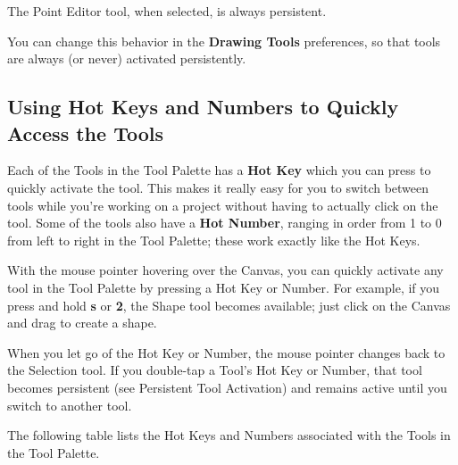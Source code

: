 \documentclass[../main.tex]{subfiles}
\begin{document}

\begin{ognote}
  The Point Editor tool, when selected, is always persistent.
\end{ognote}

You can change this behavior in the \textbf{Drawing Tools} preferences, so that tools are always
(or never) activated persistently.

\subsection{Using Hot Keys and Numbers to Quickly Access the Tools}

Each of the Tools in the Tool Palette has a \textbf{Hot Key} which you can press to quickly
activate the tool. This makes it really easy for you to switch between tools while you're
working on a project without having to actually click on the tool. Some of the tools also have
a \textbf{Hot Number}, ranging in order from 1 to 0 from left to right in the Tool Palette;
these work exactly like the Hot Keys.

With the mouse pointer hovering over the Canvas, you can quickly activate any tool in the Tool
Palette by pressing a Hot Key or Number. For example, if you press and hold \textbf{s} or
\textbf{2}, the Shape tool becomes available; just click on the Canvas and drag to create a
shape.

When you let go of the Hot Key or Number, the mouse pointer changes back to the Selection tool.
If you double-tap a Tool's Hot Key or Number, that tool becomes persistent (see Persistent
Tool Activation) and remains active until you switch to another tool.

The following table lists the Hot Keys and Numbers associated with the Tools in the Tool
Palette.
\end{document}
